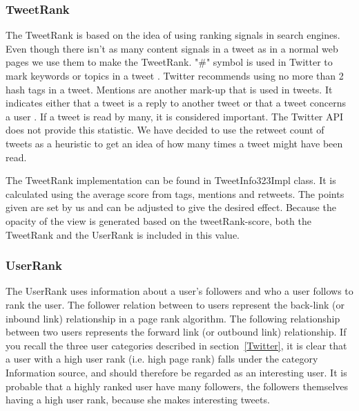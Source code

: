 \subsubsection{TweetRank}
The TweetRank is based on the idea of using ranking signals in search engines. Even though there isn't as many content signals in a tweet as in a normal web pages we use them to make the TweetRank. "\#" symbol is used in Twitter to mark keywords or topics in a tweet \citep{Twitter}. Twitter recommends using no more than 2 hash tags in a tweet. 
Mentions are another mark-up that is used in tweets. It indicates either that a tweet is a reply to another tweet or that a tweet concerns a user \citep{Twitterb}. If a tweet is read by many, it is considered important. The Twitter API does not provide this statistic. We have decided to use the retweet count of tweets as a heuristic to get an idea of how many times a tweet might have been read.

The TweetRank implementation can be found in TweetInfo323Impl class. It is calculated using the average score from tags, mentions and retweets. The points given are set by us and can be adjusted to give the desired effect. Because the opacity of the view is generated based on the tweetRank-score, both the TweetRank and the UserRank is included in this value. 

\subsubsection{UserRank}
The UserRank uses information about a user's followers and who a user follows to rank the user. The follower relation between to users represent the back-link (or inbound link) relationship in a page rank algorithm. The following relationship between two users represents the forward link (or outbound link) relationship. If you recall the three user categories described in section~\ref{Twitter}, it is clear that a user with a high user rank (i.e. high page rank) falls under the category Information source, and should therefore be regarded as an interesting user. It is probable that a highly ranked user have many followers, the followers themselves having a high user rank, because she makes interesting tweets.

